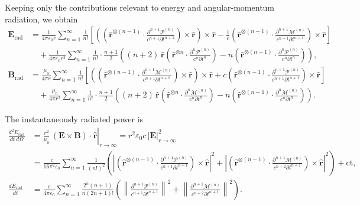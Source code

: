 \documentclass{article}
\begin{document}
	Keeping only the contributions relevant to energy and angular-momentum radiation, we obtain
	\[
	\begin{split}
		\bm{E}_{\text{rad}} &=
		\frac{1}{4\pi \varepsilon_0 r} \sum_{n=1}^{\infty} \frac{1}{n!}
		\left[ \left( \left( \bm{\hat{r}}^{\otimes (n-1)} \cdot \frac{\partial^{n+1} \bm{\mathcal{P}}^{(n)}}{c^{n+1} \partial t^{n+1}} \right) \times \bm{\hat{r}} \right) \times \bm{\hat{r}}
		- \frac{1}{c} \left( \bm{\hat{r}}^{\otimes (n-1)} \cdot \frac{\partial^{n+1} \bm{\mathcal{M}}^{(n)}}{c^{n+1} \partial t^{n+1}} \right) \times \bm{\hat{r}} \right] \\
		&\quad + \frac{1}{4\pi \varepsilon_0 r^2} \sum_{n=1}^{\infty} \frac{1}{n!} \cdot \frac{n+1}{2}
		\left( (n+2)\, \bm{\hat{r}} \left( \bm{\hat{r}}^{\otimes n} \cdot \frac{\partial^n \bm{\mathcal{P}}^{(n)}}{c^n \partial t^n} \right)
		- n \left( \bm{\hat{r}}^{\otimes (n-1)} \cdot \frac{\partial^n \bm{\mathcal{P}}^{(n)}}{c^n \partial t^n} \right) \right), \\
		\bm{B}_{\text{rad}} &=
		\frac{\mu_0}{4\pi r} \sum_{n=1}^{\infty} \frac{1}{n!}
		\left[ \left( \left( \bm{\hat{r}}^{\otimes (n-1)} \cdot \frac{\partial^{n+1} \bm{\mathcal{M}}^{(n)}}{c^{n+1} \partial t^{n+1}} \right) \times \bm{\hat{r}} \right) \times \bm{\hat{r}}
		+ c \left( \bm{\hat{r}}^{\otimes (n-1)} \cdot \frac{\partial^{n+1} \bm{\mathcal{P}}^{(n)}}{c^{n+1} \partial t^{n+1}} \right) \times \bm{\hat{r}} \right] \\
		&\quad + \frac{\mu_0}{4\pi r^2} \sum_{n=1}^{\infty} \frac{1}{n!} \cdot \frac{n+1}{2}
		\left( (n+2)\, \bm{\hat{r}} \left( \bm{\hat{r}}^{\otimes n} \cdot \frac{\partial^n \bm{\mathcal{M}}^{(n)}}{c^n \partial t^n} \right)
		- n \left( \bm{\hat{r}}^{\otimes (n-1)} \cdot \frac{\partial^n \bm{\mathcal{M}}^{(n)}}{c^n \partial t^n} \right) \right).
	\end{split}
	\]
	
	The instantaneously radiated power is
	\small
	\[
	\begin{split}
		\frac{d^2 E_{\text{rad}}}{dt\,d\Omega}
		&= \left. \frac{r^2}{\mu_0} \, (\bm{E} \times \bm{B}) \cdot \bm{\hat{r}} \right|_{r \to \infty}
		= r^2 \varepsilon_0 c \, |\bm{E}|^2_{r \to \infty} \\
		&= \frac{c}{16\pi^2 \varepsilon_0} \sum_{n=1}^{\infty} \frac{1}{(n!)^2} \left(
		\left| \left( \bm{\hat{r}}^{\otimes (n-1)} \cdot \frac{\partial^{n+1} \bm{\mathcal{P}}^{(n)}}{c^{n+1} \partial t^{n+1}} \right) \times \bm{\hat{r}} \right|^2
		+ \left| \left( \bm{\hat{r}}^{\otimes (n-1)} \cdot \frac{\partial^{n+1} \bm{\mathcal{M}}^{(n)}}{c^{n+2} \partial t^{n+1}} \right) \times \bm{\hat{r}} \right|^2 \right)
		+ \text{ct}, \\
		\frac{dE_{\text{rad}}}{dt} &= \frac{c}{4\pi \varepsilon_0} \sum_{n=1}^{\infty} \frac{2^n (n+1)}{n (2n+1)!}
		\left( \left\| \frac{\partial^{n+1} \bm{\mathcal{P}}^{(n)}}{c^{n+1} \partial t^{n+1}} \right\|^2
		+ \left\| \frac{\partial^{n+1} \bm{\mathcal{M}}^{(n)}}{c^{n+2} \partial t^{n+1}} \right\|^2 \right).
	\end{split}
	\]
	\normalsize
	
\end{document}
